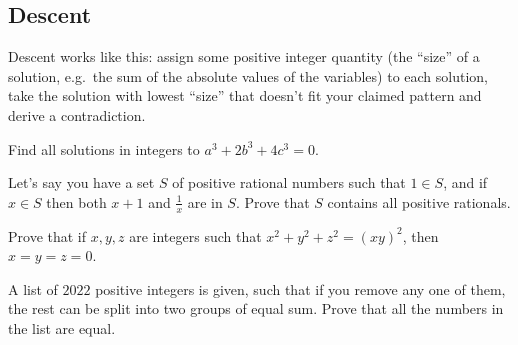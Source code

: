 \subsection{Descent}
Descent works like this: assign some positive integer quantity
(the ``size'' of a solution, e.g.\ the sum of the absolute values of the
variables) to each solution, take the solution with lowest
``size'' that doesn't fit your claimed pattern and derive a contradiction.
\begin{problem}{\label{p:i:n:d:1}}
    Find all solutions in integers to $a^3+2b^3+4c^3=0$.
\end{problem}
\begin{problem}{\label{p:i:n:d:2}}
    Let's say you have a set $S$ of positive rational numbers such that
      $1\in S$, and if $x\in S$ then both $x+1$ and $\frac 1x$ are in $S$. Prove
      that $S$ contains all positive rationals.
\end{problem}
\begin{problem}{\label{p:i:n:d:3}}
    Prove that if $x, y, z$ are integers such that $x^2+y^2+z^2=(xy)^2$,
      then $x=y=z=0$.
\end{problem}
\begin{problem}{\label{p:i:n:d:4}}
    A list of $2022$ positive integers is given, such that if you remove
      any one of them, the rest can be split into two groups of equal sum.
      Prove that all the numbers in the list are equal.
\end{problem}
